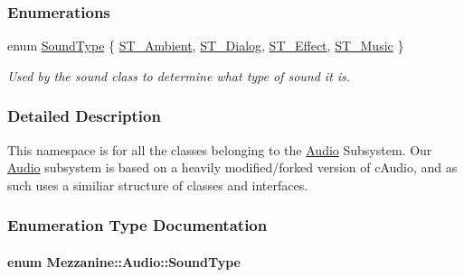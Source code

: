 \subsubsection*{Enumerations}
\begin{DoxyCompactItemize}
\item 
enum \hyperlink{namespaceMezzanine_1_1Audio_a316b2244b8be1a8c441a39b0a246295e}{SoundType} \{ \hyperlink{namespaceMezzanine_1_1Audio_a316b2244b8be1a8c441a39b0a246295ead2a032a407e097b7bb7d5a385653aad0}{ST\_\-Ambient}, 
\hyperlink{namespaceMezzanine_1_1Audio_a316b2244b8be1a8c441a39b0a246295eae976bb4e3c6ed427af5bfa77a579d2c5}{ST\_\-Dialog}, 
\hyperlink{namespaceMezzanine_1_1Audio_a316b2244b8be1a8c441a39b0a246295ea93feb4ba046a6f320ad48bf064efb939}{ST\_\-Effect}, 
\hyperlink{namespaceMezzanine_1_1Audio_a316b2244b8be1a8c441a39b0a246295ea8b58a4bf5a48652cdb9108e0227adc70}{ST\_\-Music}
 \}
\begin{DoxyCompactList}\small\item\em Used by the sound class to determine what type of sound it is. \item\end{DoxyCompactList}\end{DoxyCompactItemize}


\subsubsection{Detailed Description}
This namespace is for all the classes belonging to the \hyperlink{namespaceMezzanine_1_1Audio}{Audio} Subsystem. Our \hyperlink{namespaceMezzanine_1_1Audio}{Audio} subsystem is based on a heavily modified/forked version of cAudio, and as such uses a similiar structure of classes and interfaces. 

\subsubsection{Enumeration Type Documentation}
\hypertarget{namespaceMezzanine_1_1Audio_a316b2244b8be1a8c441a39b0a246295e}{
\paragraph[{SoundType}]{\setlength{\rightskip}{0pt plus 5cm}enum {\bf Mezzanine::Audio::SoundType}}\hfill}
\label{namespaceMezzanine_1_1Audio_a316b2244b8be1a8c441a39b0a246295e}


